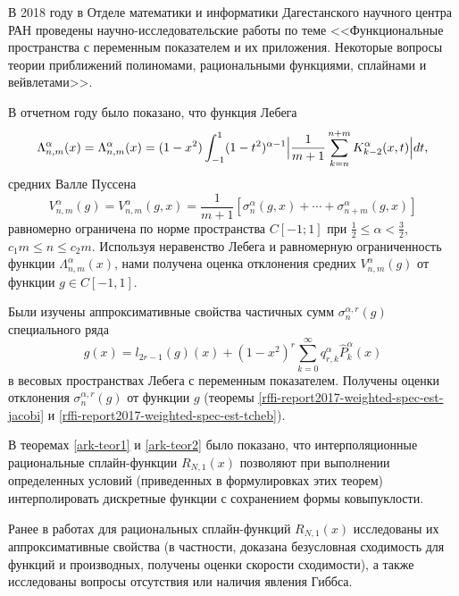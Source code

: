 \Conclusion

В 2018 году в Отделе математики и информатики Дагестанского научного центра РАН проведены научно-исследовательские работы по теме
<<Функциональные пространства с переменным показателем и их приложения. Некоторые вопросы теории приближений полиномами, рациональными функциями, сплайнами и вейвлетами>>.

В отчетном году было показано, что функция Лебега
$$\Lambda_{n,m}^\alpha(x)=\Lambda_{n,m}^\alpha(x)=
(1-x^2)\int_{-1}^{1}(1-t^2)^{\alpha-1}\Bigl|
\frac{1}{m+1}\sum\limits_{k=n}^{n+m}K^\alpha_{k-2}(x,t)
\Bigr|dt,$$
средних Валле Пуссена
$$V_{n,m}^\alpha(g)=V_{n,m}^\alpha(g,x)=\frac{1}{m+1}[\sigma_n^\alpha(g,x)+\cdots+\sigma_{n+m}^\alpha(g,x)]$$
равномерно ограничена по норме пространства $C[-1;1]$ при $\frac12\le\alpha<\frac32$, $c_1m \le n\le c_2m$. Используя неравенство Лебега и равномерную ограниченность функции $\Lambda_{n,m}^\alpha(x)$, нами получена оценка отклонения средних $V_{n,m}^\alpha(g)$  от  функции $g\in C[-1,1]$.


Были изучены аппроксимативные свойства частичных сумм $\sigma_{n}^{\alpha,r}(g)$ специального ряда
$$g(x)=l_{2r-1}(g)(x)+(1-x^2)^r\sum_{k=0}^\infty q_{r,k}^\alpha\hat P_k^\alpha(x)$$ в весовых пространствах Лебега с переменным показателем. Получены оценки отклонения $\sigma_{n}^{\alpha,r}(g)$ от функции $g$ (теоремы \ref{rffi-report2017-weighted-spec-est-jacobi} и \ref{rffi-report2017-weighted-spec-est-tcheb}).





В теоремах \ref{ark-teor1} и \ref{ark-teor2} было показано, что интерполяционные рациональные
сплайн-функции $R_{N,1}(x)$ позволяют при выполнении определенных условий
(приведенных в формулировках этих теорем) интерполировать дискретные функции
с сохранением формы ковыпуклости.

Ранее в работах \cite{ark-12,ark-13,ark-14,ark-15} для рациональных
сплайн-функций $R_{N,1}(x)$ исследованы их аппроксимативные свойства
 (в частности, доказана безусловная сходимость для функций и производных, получены
 оценки скорости сходимости), а также исследованы вопросы отсутствия или наличия
явления Гиббса.


